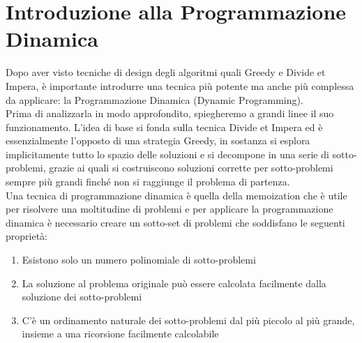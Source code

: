 \chapter{Introduzione alla Programmazione Dinamica}

Dopo aver visto tecniche di design degli algoritmi quali Greedy e Divide et
Impera, è importante introdurre una tecnica più potente ma anche più complessa
da applicare: la Programmazione Dinamica (Dynamic Programming).\\

Prima di analizzarla in modo approfondito, spiegheremo a grandi linee il suo
funzionamento. L'idea di base si fonda sulla tecnica Divide et Impera ed è
essenzialmente l'opposto di una strategia Greedy, in sostanza si esplora
implicitamente tutto lo spazio delle soluzioni e si decompone in una serie di
sotto-problemi, grazie ai quali si costruiscono soluzioni corrette per
sotto-problemi sempre più grandi finché non si raggiunge il problema di
partenza.\\
\- Una tecnica di programmazione dinamica è quella della memoization che è utile
per risolvere una moltitudine di problemi e per applicare la programmazione
dinamica è necessario creare un sotto-set di problemi che soddisfano le seguenti
proprietà:

\begin{enumerate}
    \item Esistono solo un numero polinomiale di sotto-problemi
    \item La soluzione al
          problema originale può essere calcolata facilmente dalla soluzione dei
          sotto-problemi
    \item C'è un ordinamento naturale dei sotto-problemi dal più piccolo
          al più grande, insieme a una ricorsione facilmente calcolabile
\end{enumerate}
